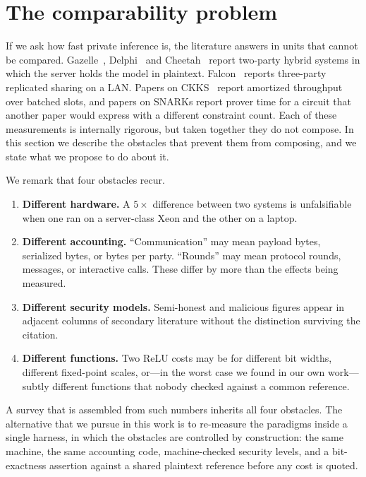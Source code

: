 \documentclass[11pt]{article}
\newcommand{\ReLU}{\ensuremath{\mathrm{ReLU}}}
\begin{document}
\medskip
{\small\setlength{\parskip}{0pt}
 \setcounter{tocdepth}{2}
 \tableofcontents}
\clearpage


\section{The comparability problem}
\label{sec:intro}

If we ask how fast private inference is, the literature answers in units that
cannot be compared. Gazelle~\cite{Gazelle}, Delphi~\cite{Delphi} and
Cheetah~\cite{Cheetah} report two-party hybrid systems in which the server holds the
model in plaintext. Falcon~\cite{Falcon} reports three-party replicated sharing on a
LAN. Papers on CKKS~\cite{CKKS} report amortized throughput over batched slots, and
papers on SNARKs report prover time for a circuit that another paper would express
with a different constraint count. Each of these measurements is internally rigorous,
but taken together they do not compose. In this section we describe the obstacles that
prevent them from composing, and we state what we propose to do about it.

We remark that four obstacles recur.

\begin{enumerate}
  \item \textbf{Different hardware.} A $5\times$ difference between two systems
    is unfalsifiable when one ran on a server-class Xeon and the other on a
    laptop.
  \item \textbf{Different accounting.} ``Communication'' may mean payload bytes,
    serialized bytes, or bytes per party. ``Rounds'' may mean protocol rounds,
    messages, or interactive calls. These differ by more than the effects being
    measured.
  \item \textbf{Different security models.} Semi-honest and malicious figures
    appear in adjacent columns of secondary literature without the distinction
    surviving the citation.
  \item \textbf{Different functions.} Two \ReLU{} costs may be for different bit
    widths, different fixed-point scales, or---in the worst case we found in our
    own work---subtly different functions that nobody checked against a common
    reference.
\end{enumerate}

A survey that is assembled from such numbers inherits all four obstacles. The
alternative that we pursue in this work is to re-measure the paradigms inside a single
harness, in which the obstacles are controlled by construction: the same machine, the
same accounting code, machine-checked security levels, and a bit-exactness assertion
against a shared plaintext reference before any cost is quoted.
\end{document}
